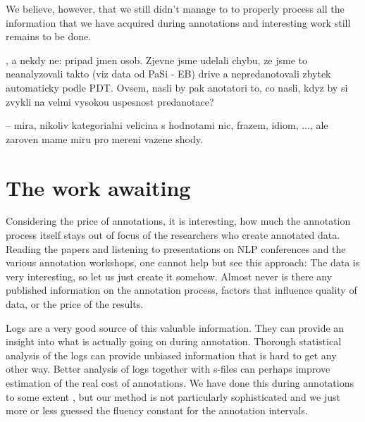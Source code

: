 We believe, however, that we still didn't manage to to properly process all the information that we have acquired during annotations and interesting work still remains to be done.
%

, a nekdy ne: pripad jmen osob. Zjevne jsme udelali chybu, ze jsme to neanalyzovali takto (viz data od PaSi - EB) drive a nepredanotovali zbytek automaticky podle PDT. Ovsem, nasli by pak anotatori to, co nasli, kdyz by si zvykli na velmi vysokou uspesnost predanotace?

 -- mira, nikoliv kategorialni velicina s hodnotami nic, frazem, idiom, ..., ale zaroven mame miru pro mereni vazene shody. 

\section{The work awaiting}
\label{sec:conc:logs}
Considering the price of annotations, it is interesting, how much the annotation process itself stays out of focus of the researchers who create annotated data. Reading the papers and listening to presentations on NLP conferences and the various annotation workshops, one cannot help but see this approach: The data is very interesting, so let us just create it somehow. Almost never is there any published information on the annotation process, factors that influence quality of data, or the price of the results. 

Logs are a  very good source of this valuable information. They can provide an insight into what is actually going on during annotation. Thorough statistical analysis of the logs can provide unbiased information that is hard to get any other way. Better analysis of logs together with s-files can perhaps improve estimation of the real cost of annotations. We have done this during annotations to some extent , but our method is not particularly sophisticated and we just more or less guessed the fluency constant for the annotation intervals.
 
